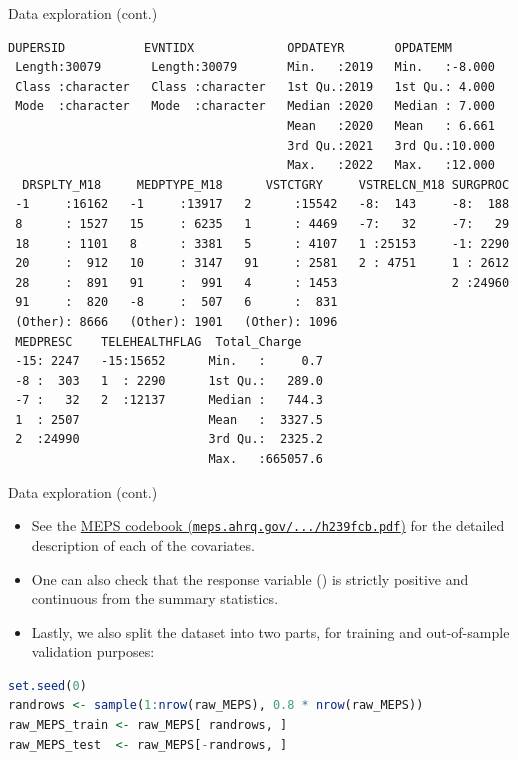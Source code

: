 \begin{frame}[fragile]{Data exploration (cont.)}
\begin{lstlisting}[style=output,basicstyle=\ttfamily\tiny\color{black!75}]
   DUPERSID           EVNTIDX             OPDATEYR       OPDATEMM
 Length:30079       Length:30079       Min.   :2019   Min.   :-8.000
 Class :character   Class :character   1st Qu.:2019   1st Qu.: 4.000
 Mode  :character   Mode  :character   Median :2020   Median : 7.000
                                       Mean   :2020   Mean   : 6.661
                                       3rd Qu.:2021   3rd Qu.:10.000
                                       Max.   :2022   Max.   :12.000
  DRSPLTY_M18     MEDPTYPE_M18      VSTCTGRY     VSTRELCN_M18 SURGPROC
 -1     :16162   -1     :13917   2      :15542   -8:  143     -8:  188
 8      : 1527   15     : 6235   1      : 4469   -7:   32     -7:   29
 18     : 1101   8      : 3381   5      : 4107   1 :25153     -1: 2290
 20     :  912   10     : 3147   91     : 2581   2 : 4751     1 : 2612
 28     :  891   91     :  991   4      : 1453                2 :24960
 91     :  820   -8     :  507   6      :  831
 (Other): 8666   (Other): 1901   (Other): 1096
 MEDPRESC    TELEHEALTHFLAG  Total_Charge
 -15: 2247   -15:15652      Min.   :     0.7
 -8 :  303   1  : 2290      1st Qu.:   289.0
 -7 :   32   2  :12137      Median :   744.3
 1  : 2507                  Mean   :  3327.5
 2  :24990                  3rd Qu.:  2325.2
                            Max.   :665057.6
\end{lstlisting}
\end{frame}

\begin{frame}[fragile]{Data exploration (cont.)}
\begin{itemize}
  \item See the \href{https://meps.ahrq.gov/data_stats/download_data/pufs/h239f/h239fcb.pdf}{MEPS codebook (\texttt{meps.ahrq.gov/.../h239fcb.pdf})} for the detailed description of each of the covariates.
  \item One can also check that the response variable () is strictly positive and continuous from the summary statistics.
  \item Lastly, we also split the dataset into two parts, for training and out-of-sample validation purposes:
\end{itemize}
\begin{lstlisting}[language=R]
set.seed(0)
randrows <- sample(1:nrow(raw_MEPS), 0.8 * nrow(raw_MEPS))
raw_MEPS_train <- raw_MEPS[ randrows, ]
raw_MEPS_test  <- raw_MEPS[-randrows, ]
\end{lstlisting}
\end{frame}

